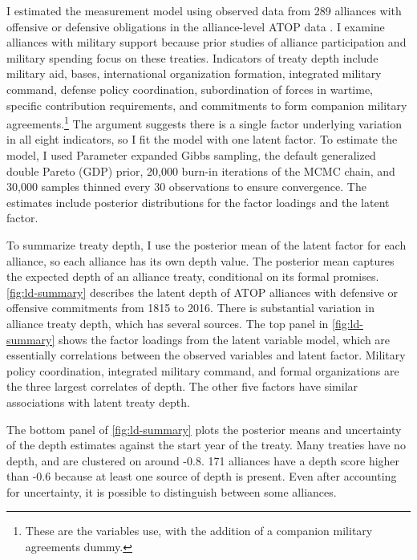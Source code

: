 \documentclass[12pt]{article}
\begin{document}
I estimated the measurement model using observed data from 289 alliances with offensive or defensive obligations in the alliance-level ATOP data \citep{Leedsetal2002}. 
I examine alliances with military support because prior studies of alliance participation and military spending focus on these treaties.
Indicators of treaty depth include military aid, bases, international organization formation, integrated military command, defense policy coordination, subordination of forces in wartime, specific contribution requirements, and commitments to form companion military agreements.\footnote{These are the variables \citet{LeedsAnac2005} use, with the addition of a companion military agreements dummy.}
The argument suggests there is a single factor underlying variation in all eight indicators, so I fit the model with one latent factor. 
To estimate the model, I used Parameter expanded Gibbs sampling, the default generalized double Pareto (GDP) prior, 20,000 burn-in iterations of the MCMC chain, and 30,000 samples thinned every 30 observations to ensure convergence. 
The estimates include posterior distributions for the factor loadings and the latent factor. 


To summarize treaty depth, I use the posterior mean of the latent factor for each alliance, so each alliance has its own depth value.
The posterior mean captures the expected depth of an alliance treaty, conditional on its formal promises. 
\autoref{fig:ld-summary} describes the latent depth of ATOP alliances with defensive or offensive commitments from 1815 to 2016.
There is substantial variation in alliance treaty depth, which has several sources. 
The top panel in \autoref{fig:ld-summary} shows the factor loadings from the latent variable model, which are essentially correlations between the observed variables and latent factor. 
Military policy coordination, integrated military command, and formal organizations are the three largest correlates of depth. 
The other five factors have similar associations with latent treaty depth. 


The bottom panel of \autoref{fig:ld-summary} plots the posterior means and uncertainty of the depth estimates against the start year of the treaty. 
Many treaties have no depth, and are clustered on around -0.8.  
171 alliances have a depth score higher than -0.6 because at least one source of depth is present. 
Even after accounting for uncertainty, it is possible to distinguish between some alliances. 
\end{document}
